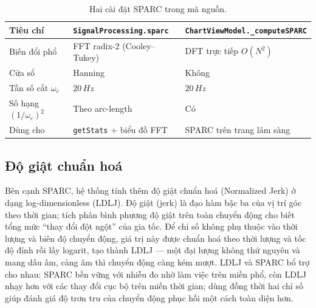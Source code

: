 \documentclass[../DoAn.tex]{subfiles}
\begin{document}
\begin{table}[H]
    \centering
    \caption{Hai cài đặt SPARC trong mã nguồn.}
    \label{tab:sparc_impl}
    \begin{tabular}{p{3.6cm} p{4.6cm} p{4.6cm}}
        \toprule
        \textbf{Tiêu chí}        & \textbf{\texttt{SignalProcessing.sparc}} & \textbf{\texttt{ChartViewModel.\_computeSPARC}} \\
        \midrule
        Biến đổi phổ             & FFT radix-2 (Cooley--Tukey)              & DFT trực tiếp $O(N^2)$                          \\
        Cửa sổ                   & Hanning                                  & Không                                           \\
        Tần số cắt $\omega_c$    & $20\,\si{Hz}$                            & $20\,\si{Hz}$                                   \\
        Số hạng $(1/\omega_c)^2$ & Theo arc-length                          & Có                                              \\
        Dùng cho                 & \texttt{getStats} + biểu đồ FFT          & SPARC trên trang lâm sàng                       \\
        \bottomrule
    \end{tabular}
\end{table}

\subsection{Độ giật chuẩn hoá}
Bên cạnh SPARC, hệ thống tính thêm độ giật chuẩn hoá (Normalized Jerk) ở dạng log-dimensionless (LDLJ). Độ giật (jerk) là đạo hàm bậc ba của vị trí góc theo thời gian; tích phân bình phương độ giật trên toàn chuyển động cho biết tổng mức ``thay đổi đột ngột'' của gia tốc. Để chỉ số không phụ thuộc vào thời lượng và biên độ chuyển động, giá trị này được chuẩn hoá theo thời lượng và tốc độ đỉnh rồi lấy logarit, tạo thành LDLJ --- một đại lượng không thứ nguyên và mang dấu âm, càng âm thì chuyển động càng kém mượt. LDLJ và SPARC bổ trợ cho nhau: SPARC bền vững với nhiễu đo nhờ làm việc trên miền phổ, còn LDLJ nhạy hơn với các thay đổi cục bộ trên miền thời gian; dùng đồng thời hai chỉ số giúp đánh giá độ trơn tru của chuyển động phục hồi một cách toàn diện hơn.
\end{document}
